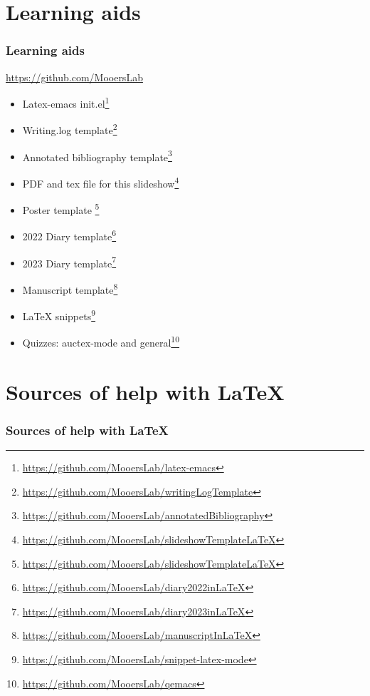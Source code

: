 \documentclass{beamer}
\newcommand{\heart}{\ensuremath\heartsuit}
\begin{document}
\section{Learning aids}
\begin{frame}
\frametitle{Learning aids}
\begin{center}
 \url{https://github.com/MooersLab}
{\scriptsize
\begin{itemize}[font=$\bullet$\scshape\bfseries]
\item Latex-emacs init.el\footnote{\url{https://github.com/MooersLab/latex-emacs}}
\item Writing.log template\footnote{\url{https://github.com/MooersLab/writingLogTemplate}}
\item Annotated bibliography template\footnote{\url{https://github.com/MooersLab/annotatedBibliography}}
\item PDF and tex file for this slideshow\footnote{\url{https://github.com/MooersLab/slideshowTemplateLaTeX}} 
\item Poster template \footnote{\url{https://github.com/MooersLab/slideshowTemplateLaTeX}}   
\item 2022 Diary template\footnote{\url{https://github.com/MooersLab/diary2022inLaTeX}}
\item 2023 Diary template\footnote{\url{https://github.com/MooersLab/diary2023inLaTeX}}
\item Manuscript template\footnote{\url{https://github.com/MooersLab/manuscriptInLaTeX}}
\item LaTeX snippets\footnote{\url{https://github.com/MooersLab/snippet-latex-mode}}
\item Quizzes: auctex-mode and general\footnote{\url{https://github.com/MooersLab/qemacs}}
\end{itemize}
}
\end{center}
\end{frame}
\note{}


\section{Sources of help with \LaTeX}
\begin{frame}
\frametitle{Sources of help with \LaTeX }
\begin{center}
\begin{Large}
\end{Large}
\end{center}
\end{frame}
\note{}
\end{document}
